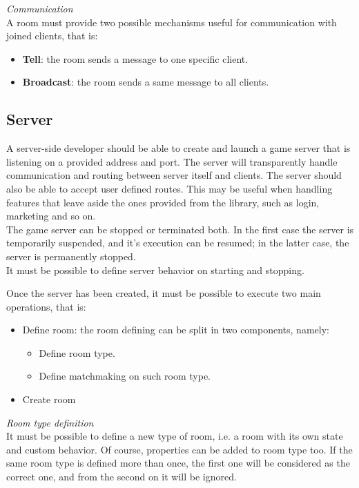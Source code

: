 \bigskip
\textit{Communication}
\\
A room must provide two possible mechanisms useful for communication with joined clients, that is:
\begin{itemize}
\item \textbf{Tell}: the room sends a message to one specific client.
\item \textbf{Broadcast}: the room sends a same message to all clients. 
\end{itemize} 


\subsection{Server} \label{server-requirements-gathering}

A server-side developer should be able to create and launch a game server that is listening on a provided address and port. The server will transparently handle communication and routing between server itself and clients. The server should also be able to accept user defined routes. This may be useful when handling features that leave aside the ones provided from the library, such as login, marketing and so on.
\\
The game server can be stopped or terminated both. In the first case the server is temporarily suspended, and it's execution can be resumed; in the latter case, the server is permanently stopped.
\\
It must be possible to define server behavior on starting and stopping.

\bigskip
Once the server has been created, it must be possible to execute two main operations, that is:
\begin{itemize}
\item Define room: the room defining can be split in two components, namely:
  \begin{itemize}
  \item Define room type.
  \item Define matchmaking on such room type.
  \end{itemize}
\item Create room
\end{itemize}

\bigskip
\textit{Room type definition}
\\
It must be possible to define a new type of room, i.e. a room with its own state and custom behavior. Of course, properties can be added to room type too.
If the same room type is defined more than once, the first one will be considered as the correct one, and from the second on it will be ignored.

